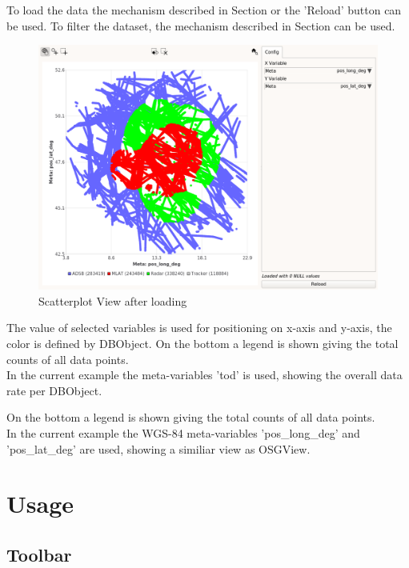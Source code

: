 To load the data the mechanism described in Section  or the 'Reload' button can be used. To filter the dataset, the mechanism described in Section  can be used. \\

\begin{figure}[H]
    \hspace*{-2cm}
    \includegraphics[width=18cm,frame]{figures/scatter_loaded.png}
  \caption{Scatterplot View after loading}
\end{figure}

The value of selected variables is used for positioning on x-axis and y-axis, the color is defined by DBObject. On the bottom a legend is shown giving the total counts of all data points. \\

In the current example the meta-variables 'tod' is used, showing the overall data rate per DBObject.

On the bottom a legend is shown giving the total counts of all data points. \\

In the current example the WGS-84 meta-variables 'pos\_long\_deg' and 'pos\_lat\_deg' are used, showing a similiar view as OSGView.


\section{Usage}

\subsection{Toolbar}

